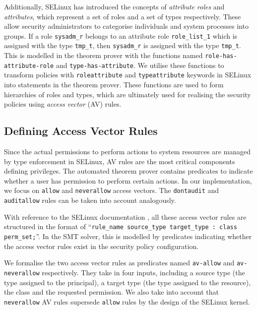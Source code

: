 \documentclass[acmsmall,screen,nonacm]{acmart}
\begin{document}
Additionally, SELinux has introduced the concepts of \textit{attribute roles} 
and \textit{attributes}, which represent a set of roles and a set of types 
respectively. These allow security administrators to categorise individuals and 
system processes into groups. If a role \texttt{sysadm\_r} belongs to an 
attribute role \texttt{role\_list\_1} which is assigned with the type 
\texttt{tmp\_t}, then \texttt{sysadm\_r} is assigned with the type 
\texttt{tmp\_t}. This is modelled in the theorem prover with the functions 
named \texttt{role-has-attribute-role} and \texttt{type-has-attribute}. We 
utilise these functions to transform policies with \texttt{roleattribute} and 
\texttt{typeattribute} keywords in SELinux into statements in the theorem 
prover. These functions are used to form hierarchies of roles and types, which 
are ultimately used for realising the security policies using \textit{access 
vector} (AV) rules.

\subsection{Defining Access Vector Rules}

Since the actual permissions to perform actions to system resources are managed 
by type enforcement in SELinux, AV rules are the most critical components 
defining privileges. The automated theorem prover contains predicates to 
indicate whether a user has permission to perform certain actions. In our 
implementation, we focus on \texttt{allow} and \texttt{neverallow} access 
vectors. The \texttt{dontaudit} and \texttt{auditallow} rules can be taken into 
account analogously.

With reference to the SELinux documentation \cite{selinuxproject-avc}, all 
these access vector rules are structured in the format of ``\texttt{rule\_name 
source\_type target\_type : class perm\_set;}''. In the SMT solver, this is 
modelled by predicates indicating whether the access vector rules exist in the 
security policy configuration.

We formalise the two access vector rules as predicates named \texttt{av-allow} 
and \texttt{av-neverallow} respectively. They take in four inputs, including a 
source type (the type assigned to the principal), a target type (the type 
assigned to the resource), the class and the requested permission. We also take 
into account that \texttt{neverallow} AV rules supersede \texttt{allow} rules 
by the design of the SELinux kernel.

\bigskip
\end{document}
